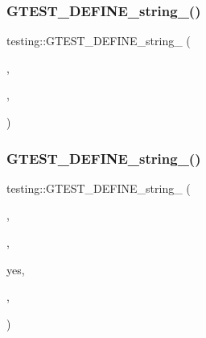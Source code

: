 \subsubsection{\texorpdfstring{G\+T\+E\+S\+T\+\_\+\+D\+E\+F\+I\+N\+E\+\_\+string\+\_\+()}{GTEST\_DEFINE\_string\_()}\hspace{0.1cm}{\footnotesize\ttfamily [1/5]}}
{\footnotesize\ttfamily testing\+::\+G\+T\+E\+S\+T\+\_\+\+D\+E\+F\+I\+N\+E\+\_\+string\+\_\+ (\begin{DoxyParamCaption}\item[{death\+\_\+test\+\_\+style}]{,  }\item[{\hyperlink{namespacetesting_1_1internal_ac54dabc540bf79c2de91add679bfb93b}{internal\+::\+String\+From\+G\+Test\+Env}(\char`\"{}death\+\_\+test\+\_\+style\char`\"{}, k\+Default\+Death\+Test\+Style)}]{,  }\item[{\char`\"{}Indicates how to run a death test in a forked child process\+: \char`\"{} \char`\"{}\textbackslash{}eadsafe\textbackslash{}hild process re-\/executes the test binary \char`\"{} \char`\"{}from the beginning, running only the specific death test) or \char`\"{} \char`\"{}\textbackslash{}t\textbackslash{}hild process runs the death test immediately \char`\"{} \char`\"{}after forking).\char`\"{}}]{ }\end{DoxyParamCaption})}

\mbox{\label{namespacetesting_a32f0280e95e7718835b0e3d2f7277269}} 
\subsubsection{\texorpdfstring{G\+T\+E\+S\+T\+\_\+\+D\+E\+F\+I\+N\+E\+\_\+string\+\_\+()}{GTEST\_DEFINE\_string\_()}\hspace{0.1cm}{\footnotesize\ttfamily [2/5]}}
{\footnotesize\ttfamily testing\+::\+G\+T\+E\+S\+T\+\_\+\+D\+E\+F\+I\+N\+E\+\_\+string\+\_\+ (\begin{DoxyParamCaption}\item[{color}]{,  }\item[{\hyperlink{namespacetesting_1_1internal_ac54dabc540bf79c2de91add679bfb93b}{internal\+::\+String\+From\+G\+Test\+Env}(\char`\"{}color\char`\"{}, \char`\"{}auto\char`\"{})}]{,  }\item[{\char`\"{}Whether to use colors in the output. Valid values\+:}]{yes,  }\item[{no}]{,  }\item[{\char`\"{} \char`\"{}and auto. \textquotesingle{}auto\textquotesingle{} means to use colors if the output is \char`\"{} \char`\"{}being sent to a terminal and the T\+E\+RM environment variable \char`\"{} \char`\"{}is set to a terminal type that supports colors.\char`\"{}}]{ }\end{DoxyParamCaption})}

